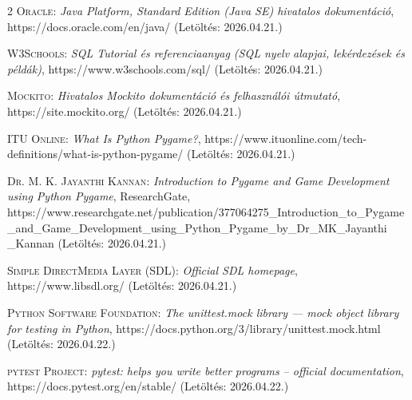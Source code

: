 \documentclass[]{thesis-ekf}
\begin{document}
\begin{thebibliography}{2}
		\textsc{Oracle}: \emph{Java Platform, Standard Edition (Java SE) hivatalos dokumentáció}, https://docs.oracle.com/en/java/ (Letöltés: 2026.04.21.)
		
		\textsc{W3Schools}: \emph{SQL Tutorial és referenciaanyag (SQL nyelv alapjai, lekérdezések és példák)}, https://www.w3schools.com/sql/ (Letöltés: 2026.04.21.)
	
		\textsc{Mockito}: \emph{Hivatalos Mockito dokumentáció és felhasználói útmutató}, https://site.mockito.org/ (Letöltés: 2026.04.21.)
		
		\textsc{ITU Online}: \emph{What Is Python Pygame?}, https://www.ituonline.com/tech-definitions/what-is-python-pygame/ (Letöltés: 2026.04.21.)
		
		
		\textsc{Dr. M. K. Jayanthi Kannan}: \emph{Introduction to Pygame and Game Development using Python Pygame}, ResearchGate, https://www.researchgate.net/publication/377064275\_Introduction\_to\_Pygame\\\_and\_Game\_Development\_using\_Python\_Pygame\_by\_Dr\_MK\_Jayanthi\\\_Kannan (Letöltés: 2026.04.21.)
		
		\textsc{Simple DirectMedia Layer (SDL)}: \emph{Official SDL homepage}, https://www.libsdl.org/ (Letöltés: 2026.04.21.)
		
		\textsc{Python Software Foundation}: \emph{The unittest.mock library — mock object library for testing in Python}, https://docs.python.org/3/library/unittest.mock.html (Letöltés: 2026.04.22.)
		
		\textsc{pytest Project}: \emph{pytest: helps you write better programs – official documentation}, https://docs.pytest.org/en/stable/ (Letöltés: 2026.04.22.)
		
	\end{thebibliography}
	
	 
	
\end{document}
